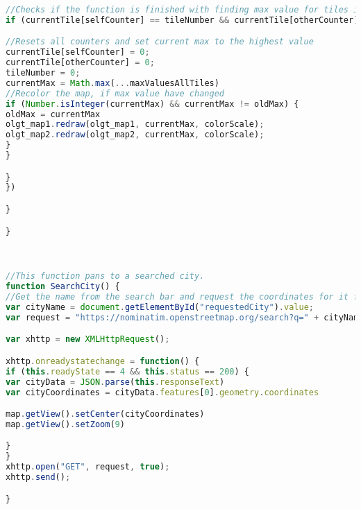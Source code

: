 \begin{lstlisting}[language=JavaScript, caption={The JavaScript for the map}, label= VoresJS,escapechar=|]
//Checks if the function is finished with finding max value for tiles in both layers
if (currentTile[selfCounter] == tileNumber && currentTile[otherCounter] == tileNumber && tileNumber != 0) {

//Resets all counters and set current max to the highest value
currentTile[selfCounter] = 0;
currentTile[otherCounter] = 0;
tileNumber = 0;
currentMax = Math.max(...maxValuesAllTiles)
//Recolor the map, if max value have changed
if (Number.isInteger(currentMax) && currentMax != oldMax) {
oldMax = currentMax
olgt_map1.redraw(olgt_map1, currentMax, colorScale);
olgt_map2.redraw(olgt_map2, currentMax, colorScale);
}
}

}
})

}

}



//This function pans to a searched city.
function SearchCity() {
//Get the name from the search bar and request the coordinates for it from Nominatim
var cityName = document.getElementById("requestedCity").value;
var request = "https://nominatim.openstreetmap.org/search?q=" + cityName + "&format=geojson"

var xhttp = new XMLHttpRequest();

xhttp.onreadystatechange = function() {
if (this.readyState == 4 && this.status == 200) {
var cityData = JSON.parse(this.responseText)
var cityCoordinates = cityData.features[0].geometry.coordinates

map.getView().setCenter(cityCoordinates)
map.getView().setZoom(9)

}
}
xhttp.open("GET", request, true);
xhttp.send();

}

\end{lstlisting}

